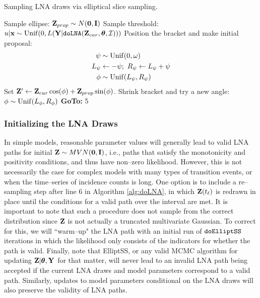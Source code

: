 \begin{algorithm}[!ht]
	\caption{Sampling LNA draws via elliptical slice sampling.}
	\label{alg:elliptss_lna}
	\begin{algorithmic}[1]
		\State Sample ellipse: $ \mathbf{Z}_{prop} \sim N(\boldsymbol{0}, \mathbf{I}) $
		\State Sample threshold: $ u|\mathbf{x} \sim \mathrm{Unif}(0, L(\mathbf{Y}|\texttt{doLNA}(\mathbf{Z}_{cur},\boldsymbol{\theta},\mathcal{I}))) $
		\State Position the bracket and make initial proposal: \vspace{-0.1in}
		\begin{align*}
		\psi &\sim \mathrm{Unif}(0,\omega)\\
		L_\psi &\leftarrow -\psi;\ R_\psi \leftarrow L_\psi + \psi\\
		\phi &\sim \mathrm{Unif}(L_\psi,R_\psi)
		\end{align*}
		\State Set $ \mathbf{Z}' \leftarrow \mathbf{Z}_{cur}\cos(\phi) + \mathbf{Z}_{prop}\sin(\phi) $. 
		\State{}
		\Else
		\State Shrink bracket and try a new angle:
		\State $ \phi \sim \mathrm{Unif}(L_\phi, R_\phi) $
		\State \textbf{GoTo:} 5
		\EndIf
		\EndProcedure
	\end{algorithmic}
\end{algorithm}

\subsubsection{Initializing the LNA Draws}
\label{subsubsec:lna_init}
In simple models, reasonable parameter values will generally lead to valid LNA paths for initial $ \mathbf{Z}\sim MVN(\boldsymbol{0},\mathbf{I}) $, i.e., paths that satisfy the monotonicity and positivity conditions, and thus have non--zero likelihood. However, this is not necessarily the case for complex models with many types of transition events, or when the time--series of incidence counts is long. One option is to include a re--sampling step after line 6 in Algorithm \ref{alg:doLNA}, in which $ \mathbf{Z}(t_\ell) $ is redrawn in place until the conditions for a valid path over the interval are met. It is important to note that such a procedure does not sample from the correct distribution since $ \mathbf{Z} $ is not actually a truncated multivariate Gaussian. To correct for this, we will ``warm--up" the LNA path with an initial run of $ \texttt{doElliptSS} $ iterations in which the likelihood only consists of the indicators for whether the path is valid. Finally, note that ElliptSS, or any valid MCMC algorithm for updating $ \mathbf{Z}|\boldsymbol{\theta},\mathbf{Y} $ for that matter, will never lead to an invalid LNA path being accepted if the current LNA draws and model parameters correspond to a valid path. Similarly, updates to model parameters conditional on the LNA draws will also preserve the validity of LNA paths.

